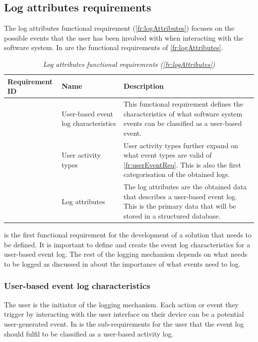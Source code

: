 \subsection{Log attributes requirements}\label{sec:ch2_logAttributesRequirements}
The log attributes functional requirement (\ref{fr:logAttributes}) focuses on the possible events that the user has been involved with when interacting with the software system. In  are the functional requirements of \ref{fr:logAttributes}.

\setcounter{phase}{1}
\begin{table}[!htb]
	\centering
	\caption[Log attributes functional requirements (\ref{fr:logAttributes})]
	{\textit{Log attributes functional requirements (\ref{fr:logAttributes})}}
	\label{tbl:ch2_loggingAttributesFunctionalRequirements}
	\begin{tabularx}{\textwidth}{|l|l|X|}
		\hline \textbf{Requirement ID} & \textbf{Name} & \textbf{Description} \\
		\hline \subphase{fr:userEventReq} & \RaggedRight User-based event log characteristics & \RaggedRight This functional requirement defines the characteristics of what software system events can be classified as a user-based event. \\
		\hline \subphase{fr:userActReq} & \RaggedRight User activity types & \RaggedRight User activity types further expand on what event types are valid of \ref{fr:userEventReq}. This is also the first categorisation of the obtained logs.\\
		\hline \subphase{fr:subLogAttributes} & \RaggedRight Log attributes & \RaggedRight The log attributes are the obtained data that describes a user-based event log. This is the primary data that will be stored in a structured database.\\
		\hline
	\end{tabularx}
\end{table}

 is the first functional requirement for the development of a solution that needs to be defined. It is important to define and create the event log characteristics for a user-based event log. The rest of the logging mechanism depends on what needs to be logged as discussed in  about the importance of what events need to log. 

\subsubsection{User-based event log characteristics}\label{sec:ch2_requirementsOfUAT}
The user is the initiator of the logging mechanism. Each action or event they trigger by interacting with the user interface on their device can be a potential user-generated event. In  is the sub-requirements for the user that the event log should fulfil to be classified as a user-based activity log.

